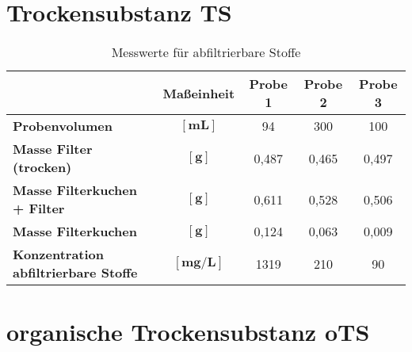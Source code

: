 
\section{Trockensubstanz TS}


\vspace*{-2.5mm}
\renewcommand{\arraystretch}{1.2}
\begin{table}[h!]
	\centering
	\caption{Messwerte für abfiltrierbare Stoffe}
	\label{tab:filter}
	\begin{tabulary}{1.7\textwidth}{L|C|CCC}
		\hline
		 & \textbf{Maßeinheit}&	\textbf{Probe 1} & \textbf{Probe 2} & \textbf{Probe 3}  \\ 
		\hline
	 	\textbf{Probenvolumen}& $\boldsymbol{\left[\si{\milli \liter}\right]}$ & 94 	& 300 	& 100\\
		\textbf{Masse Filter (trocken)} &  $\boldsymbol{\left[\si{\gram}\right]}$ & 0,487 & 0,465 & 0,497\\
		\textbf{Masse Filterkuchen + Filter }& $\boldsymbol{\left[\si{\gram}\right]}$	& 0,611 & 0,528 & 0,506\\
		\hline
		\textbf{Masse Filterkuchen} & $\boldsymbol{\left[\si{\gram}\right]}$& 0,124 &0,063&0,009\\
		\hline
		\textbf{Konzentration abfiltrierbare Stoffe}&$\boldsymbol{\left[\si{\milli \gram \per \liter}\right]}$&1319&210&90\\
		\hline
	\end{tabulary}
\end{table}
\FloatBarrier
\vspace*{-2.5mm}



\section*{organische Trockensubstanz oTS}

